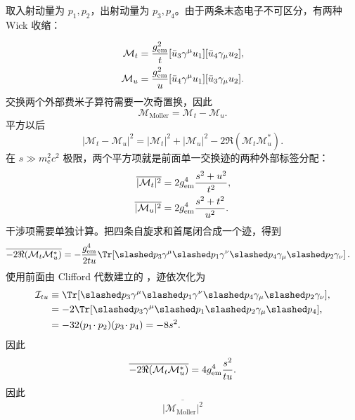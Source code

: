 \begin{derivation}
取入射动量为 $p_1,p_2$，出射动量为 $p_3,p_4$。由于两条末态电子不可区分，有两种 Wick 收缩：

\begin{align*}
 \mathcal M_t
 &=\frac{g_{\rm em}^2}{t}
 [\bar u_3\gamma^\mu u_1]
 [\bar u_4\gamma_\mu u_2],\\
 \mathcal M_u
 &=\frac{g_{\rm em}^2}{u}
 [\bar u_4\gamma^\mu u_1]
 [\bar u_3\gamma_\mu u_2].
\end{align*}
交换两个外部费米子算符需要一次奇置换，因此
\begin{equation*}
 {
 \mathcal M_{\mathrm{Moller}}=\mathcal M_t-\mathcal M_u.}
 \end{equation*}
平方以后
\begin{equation*}
 |\mathcal M_t-\mathcal M_u|^2
 =|\mathcal M_t|^2+|\mathcal M_u|^2
 -2\Re(\mathcal M_t\mathcal M_u^*).
\end{equation*}
在 $s\gg m_{\mathrm e}^2c^2$ 极限，两个平方项就是前面单一交换迹的两种外部标签分配：
\begin{align*}
 \overline{|\mathcal M_t|^2}
 &=2g_{\rm em}^4\frac{s^2+u^2}{t^2},\\
 \overline{|\mathcal M_u|^2}
 &=2g_{\rm em}^4\frac{s^2+t^2}{u^2}.
\end{align*}
干涉项需要单独计算。把四条自旋求和首尾闭合成一个迹，得到
\begin{align*}
 \overline{-2\Re(\mathcal M_t\mathcal M_u^*)}
 &=-\frac{g_{\rm em}^4}{2tu}
 \Tr\!\left[
 \slashed p_3\gamma^\mu\slashed p_1\gamma^\nu
 \slashed p_4\gamma_\mu\slashed p_2\gamma_\nu
 \right].
 \end{align*}
使用前面由 Clifford 代数建立的
，迹依次化为
\begin{align*}
 \mathcal I_{tu}
 &\equiv
 \Tr[\slashed p_3\gamma^\mu\slashed p_1\gamma^\nu
 \slashed p_4\gamma_\mu\slashed p_2\gamma_\nu],\\
 &=-2\Tr[\slashed p_3\gamma^\mu\slashed p_1\slashed p_2
 \gamma_\mu\slashed p_4],\\
 &=-32(p_1\!\cdot p_2)(p_3\!\cdot p_4)
 =-8s^2.
\end{align*}
因此
\begin{equation*}
 \overline{-2\Re(\mathcal M_t\mathcal M_u^*)}
 =4g_{\rm em}^4\frac{s^2}{tu}.
 \end{equation*}
因此
\begin{equation*}
 {
 \overline{|\mathcal M_{\mathrm{Moller}}|^2}
}
\end{equation*}
\end{derivation}
